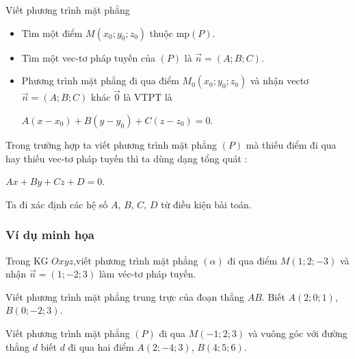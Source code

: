 \begin{dang}{Viết phương trình mặt phẳng}
\begin{itemize}
	\item Tìm  một điểm $M(x_0; y_0; z_0)$ thuộc mp$(P)$.
	\item Tìm một vec-tơ pháp tuyến của $\left(P \right)$ là $\overrightarrow{n}=(A;B;C)$.
	\item Phương trình mặt phẳng đi qua điểm $M_0(x_0;y_0;z_0)$ và nhận vectơ $\overrightarrow{n}=(A;B;C)$ khác $\overrightarrow{0}$ là VTPT là
\begin{center}
	$A(x-x_0)+B(y-y_0)+C(z-z_0)=0$.
\end{center}
	
\end{itemize}
\begin{note}
	Trong trường hợp ta viết phương trình mặt phẳng $(P)$ mà thiếu điểm đi qua hay thiếu vec-tơ pháp tuyến thì ta dùng dạng tổng quát : \begin{center}
		$Ax+By+Cz+D=0$.
	\end{center}
 Ta đi xác định các hệ số $A$, $B$, $C$, $D$ từ điều kiện bài toán.
\end{note}
\end{dang}
\setcounter{subsubsection}{0}
\setcounter{vd}{0}
\setcounter{bt}{0}
\setcounter{ex}{0}
\subsubsection{Ví dụ minh họa}
\begin{vd}%
	Trong KG $Oxyz$,viết phương trình  mặt phẳng $(\alpha)$ đi qua điểm $M(1;2;-3)$ và nhận $\vec{n}=(1;-2;3)$ làm véc-tơ pháp tuyến.
\end{vd}

\begin{vd}%
	Viết phương trình mặt phẳng trung trực của đoạn thẳng $AB$.
	Biết  $A(2;0;1)$, $B(0;-2;3)$. 
		
\end{vd}
\begin{vd}%
	Viết phương trình mặt phẳng $(P)$ đi qua $M(-1;2;3)$ và vuông góc với đường thẳng $d$ biết $d$ đi qua hai điểm $A(2;-4;3)$, $B(4;5;6)$.
\end{vd}

